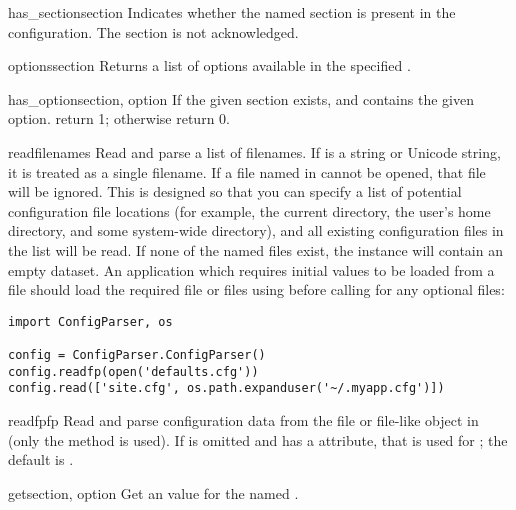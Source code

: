 \begin{methoddesc}{has_section}{section}
Indicates whether the named section is present in the
configuration. The  section is not acknowledged.
\end{methoddesc}

\begin{methoddesc}{options}{section}
Returns a list of options available in the specified .
\end{methoddesc}

\begin{methoddesc}{has_option}{section, option}
If the given section exists, and contains the given option. return 1;
otherwise return 0.
\end{methoddesc}

\begin{methoddesc}{read}{filenames}
Read and parse a list of filenames.  If  is a string or
Unicode string, it is treated as a single filename.
If a file named in  cannot be opened, that file will be
ignored.  This is designed so that you can specify a list of potential
configuration file locations (for example, the current directory, the
user's home directory, and some system-wide directory), and all
existing configuration files in the list will be read.  If none of the
named files exist, the  instance will contain an
empty dataset.  An application which requires initial values to be
loaded from a file should load the required file or files using
 before calling  for any optional
files:

\begin{verbatim}
import ConfigParser, os

config = ConfigParser.ConfigParser()
config.readfp(open('defaults.cfg'))
config.read(['site.cfg', os.path.expanduser('~/.myapp.cfg')])
\end{verbatim}
\end{methoddesc}

\begin{methoddesc}{readfp}{fp}
Read and parse configuration data from the file or file-like object in
 (only the  method is used).  If
 is omitted and  has a  attribute,
that is used for ; the default is .
\end{methoddesc}

\begin{methoddesc}{get}{section, option}
Get an  value for the named .
\end{methoddesc}

